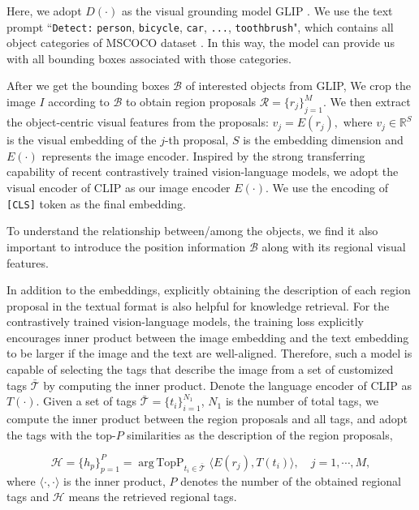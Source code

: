\documentclass{article}
\DeclareMathOperator*{\argtopp}{arg\,TopP}
\begin{document}
Here, we adopt $D(\cdot)$ as the visual grounding model GLIP \cite{li2021grounded}. We use the text prompt ``\texttt{Detect:} \texttt{person}, \texttt{bicycle}, \texttt{car}, \texttt{...}, \texttt{toothbrush}", which contains all object categories of MSCOCO dataset \cite{lin2014microsoft}. In this way, the model can provide us with all bounding boxes associated with those categories. 

After we get the bounding boxes $\mathcal{B}$ of interested objects from GLIP, 
We crop the image $I$ according to $\mathcal{B}$ to obtain region proposals $\mathcal{R}={\{r_{j}\}}_{j=1}^{M}$. We then extract the object-centric visual features from the proposals: $v_j = E(r_j),$ where $v_j\in \mathbb{R}^{S}$ is the visual embedding of the $j$-th proposal, $S$ is the embedding dimension and $E(\cdot)$ represents the image encoder. Inspired by the strong transferring capability of recent contrastively trained vision-language models, we adopt the visual encoder of CLIP \cite{radford2021learning} as our image encoder $E(\cdot)$. We use the encoding of \texttt{[CLS]} token as the final embedding. 

To understand the relationship between/among the objects, we find it also important to introduce the position information $\mathcal{B}$ along with its regional visual features.

In addition to the embeddings, explicitly obtaining the description of each region proposal in the textual format is also helpful for knowledge retrieval. For the contrastively trained vision-language models, the training loss explicitly encourages inner product between the image embedding and the text embedding to be larger if the image and the text are well-aligned. Therefore, such a model is capable of selecting the tags that describe the image from a set of customized tags $\mathcal{\bar{T}}$ by computing the inner product. Denote the language encoder of CLIP as $T(\cdot)$. Given a set of tags $\mathcal{\bar{T}} = \{t_i\}_{i=1}^{N_{1}}$, $N_{1}$ is the number of total tags, we compute the inner product between the region proposals and all tags, and adopt the tags with the top-$P$ similarities as the description of the region proposals,

\begin{equation}
    \label{retrieve_tag}
     \mathcal{H} = \{h_{p}\}_{p=1}^{P} = \argtopp_{t_i\in \mathcal{\bar{T}}}  \langle E(r_j), T(t_i) \rangle, \quad j=1, \cdots, M,
\end{equation}
where $\langle \cdot, \cdot \rangle$ is the inner product, $P$ denotes the number of the obtained regional tags and $\mathcal{H}$ means the retrieved regional tags.
\end{document}
